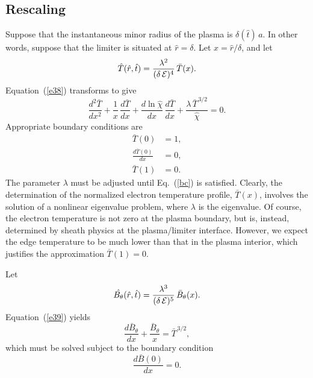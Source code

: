 \documentclass[12pt,prb,aps]{revtex4-1}
\begin{document}
\subsection{Rescaling}
Suppose that the instantaneous minor radius of the plasma is $\delta(\hat{t})\,a$. In other words, suppose that the limiter
is situated at $\hat{r}= \delta$. Let $x=\hat{r}/\delta$, and let
\begin{equation}
\hat{T}(\hat{r},\hat{t}) = \frac{\lambda^2}{(\delta\,{\cal E})^4}\,\bar{T}(x).
\end{equation}
Equation~(\ref{e38}) transforms to give
\begin{equation}\label{e41}
\frac{d^2\bar{T}}{dx^2} + \frac{1}{x}\,\frac{d\bar{T}}{dx} + \frac{d\ln\hat{\chi}}{dx}\,\frac{d\bar{T}}{dx} + \frac{\lambda\,\bar{T}^{\,3/2}}{\hat{\chi}}=0.
\end{equation}
Appropriate boundary conditions are 
\begin{align}
\bar{T}(0) &=1,\\[0.5ex]
\frac{d\bar{T}(0)}{dx}& = 0,\\[0.5ex]
\bar{T}(1) &= 0.\label{bc}
\end{align}
The parameter $\lambda$ must be adjusted until Eq.~(\ref{bc}) is satisfied. Clearly, the determination of the normalized electron temperature profile, $\bar{T}(x)$, 
involves the solution of a nonlinear eigenvalue problem, where $\lambda$ is the eigenvalue. Of course, the electron temperature is not zero at the
plasma boundary, but is, instead, determined by sheath physics at the plasma/limiter interface. However, we expect the edge temperature to
be much lower than that in the plasma interior, which justifies the approximation $\bar{T}(1)=0$. 

Let 
\begin{equation}
\hat{B_\theta}(\hat{r},\hat{t}) = \frac{\lambda^3}{(\delta\,{\cal E})^5}\,\bar{B}_\theta(x).
\end{equation}
Equation~(\ref{e39}) yields 
\begin{equation}
\frac{d\bar{B}_\theta}{dx} + \frac{\bar{B}_\theta}{x} = \bar{T}^{\,3/2},
\end{equation}
which must be solved subject to the boundary condition
\begin{equation}
\frac{d\bar{B}(0)}{dx}=0.
\end{equation}
\end{document}
